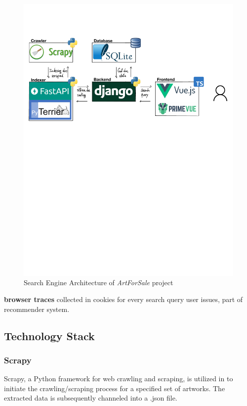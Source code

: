 \documentclass[12pt]{spieman}  %
\begin{document}
\begin{spacing}{1}
    \begin{figure}[H]
        \centering
        \caption{Search Engine Architecture of \textit{ArtForSale} project}
        \label{fig:architecture}
        \includegraphics[width=\textwidth, trim={0cm 16cm 0cm  3cm}]{figures/architecture.pdf}
    \end{figure}


    \newpage
    \textbf{browser traces} collected in cookies for every search query user issues, part of recommender system.

    \subsection{Technology Stack}

    \subsubsection{Scrapy}
    Scrapy, a Python framework for web crawling and scraping, is utilized in to initiate the crawling/scraping process for a specified set of artworks. The extracted data is subsequently channeled into a .json file.


\end{spacing}
\end{document}
